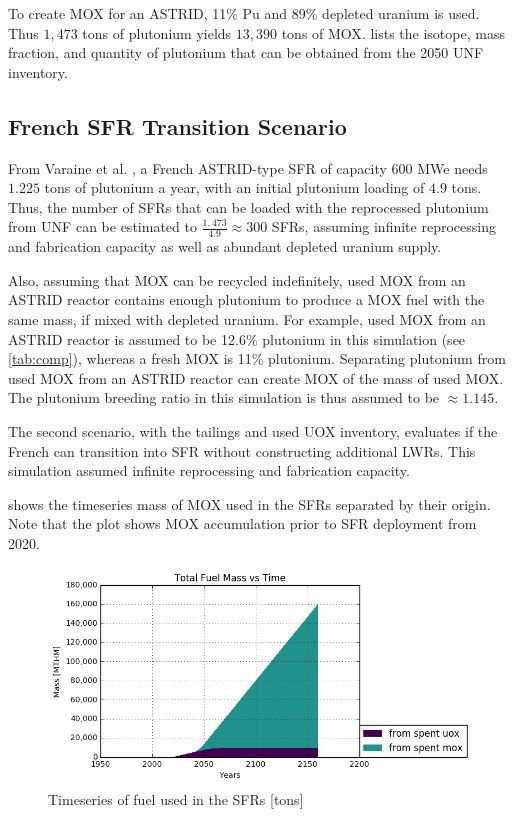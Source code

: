 To create \gls{MOX} for an ASTRID, 11\% Pu and 89\% depleted uranium is used.
Thus $1,473$ tons of plutonium yields $13,390$ tons of
\gls{MOX}.  lists the isotope, mass fraction,
and quantity of plutonium that can be obtained from the 2050 \gls{UNF} inventory.


\subsection{French \gls{SFR} Transition Scenario}

From Varaine et al. \cite{marsaultmarie-sophie_pre-conceptual_2012}, a French
ASTRID-type \gls{SFR} of capacity 600 MWe needs $1.225$ tons of
plutonium a year, with an initial plutonium loading of $4.9$ tons. 
Thus, the number of \glspl{SFR} that can be loaded with the reprocessed
plutonium from \gls{UNF} can be estimated to $\frac{1,473}{4.9} \approx 300$ \glspl{SFR},
assuming infinite reprocessing and fabrication capacity as well as
abundant depleted uranium supply. 

Also, assuming that \gls{MOX} can be recycled indefinitely,
used \gls{MOX} from an ASTRID reactor
contains enough plutonium to produce a \gls{MOX} fuel with
the same mass, if mixed with depleted uranium. For example,
used \gls{MOX} from an ASTRID reactor is assumed to be 12.6\% plutonium
in this simulation (see \cref{tab:comp}), whereas a fresh \gls{MOX} is 11\% plutonium.
Separating plutonium from used \gls{MOX} from
an ASTRID reactor can create \gls{MOX} of the mass of used \gls{MOX}.
The plutonium breeding ratio in this simulation is thus assumed to be
$\approx 1.145$.

The second scenario, with the tailings and used \gls{UOX}
inventory, evaluates if the French can transition into \gls{SFR}
without constructing additional \gls{LWR}s. This simulation
assumed infinite reprocessing and fabrication capacity.

 shows the timeseries mass of \gls{MOX} used in the 
\gls{SFR}s separated by their origin.
Note that the plot shows \gls{MOX}
accumulation prior to \gls{SFR} deployment from 2020.

\begin{figure}[htbp!]
	\begin{center}
		\includegraphics[scale=0.7]{./images/french-transition/where_fuel.png}
	\end{center}
	\caption{Timeseries of fuel used in the \gls{SFR}s [tons]}
	\label{fig:fuel}
\end{figure}

